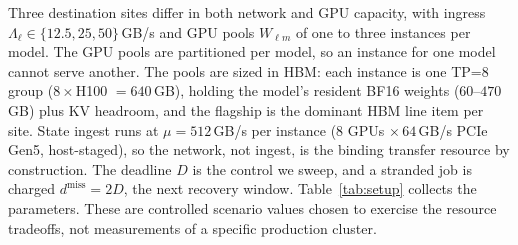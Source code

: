 Three destination sites differ in both network and GPU capacity, with ingress
$\Lambda_\ell\in\{12.5,25,50\}$\,GB/s and GPU pools $W_{\ell m}$ of one to three
instances per model. The GPU pools are partitioned per model, so an instance
for one model cannot serve another. The pools are sized in HBM: each
instance is one TP=8 group ($8{\times}$H100 $=640$\,GB), holding the model's
resident BF16 weights ($60$--$470$\,GB) plus KV headroom, and the flagship is the
dominant HBM line item per site. State ingest runs at $\mu=512$\,GB/s per
instance (8 GPUs $\times\,64$\,GB/s PCIe Gen5, host-staged), so the network, not
ingest, is the binding transfer resource by construction. The deadline $D$ is the
control we sweep, and a stranded job is charged $d^{\mathrm{miss}}=2D$, the next
recovery window. Table~\ref{tab:setup} collects the parameters. These are controlled
scenario values chosen to exercise the resource tradeoffs, not measurements of a
specific production cluster.

\begin{table}[t]
\centering
{}
\caption{Migration instance parameters. Synthetic controlled values, informed by production.}
\label{tab:setup}
\end{table}

